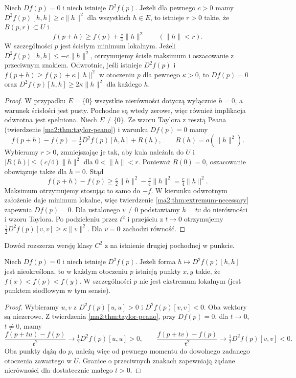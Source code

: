 \begin{twierdzenie}
\label{ma2:thm:extremum-sufficient}
Niech $Df(p)=0$ i niech istnieje $D^2f(p)$.
Jeżeli dla pewnego $c>0$ mamy
$D^2f(p)[h,h]\ge c\|h\|^2$ dla wszystkich $h\in E$,
to istnieje $r>0$ takie, że $B(p,r)\subset U$ i
\[
 f(p+h)\ge f(p)+\tfrac c4\|h\|^2
 \qquad(\|h\|<r).
\]
W szczególności $p$ jest ścisłym minimum lokalnym.
Jeżeli $D^2f(p)[h,h]\le -c\|h\|^2$, otrzymujemy
ścisłe maksimum i oszacowanie z przeciwnym znakiem.
Odwrotnie, jeśli istnieje $D^2f(p)$ i
$f(p+h)\ge f(p)+\kappa\|h\|^2$ w otoczeniu $p$
dla pewnego $\kappa>0$, to $Df(p)=0$ oraz
$D^2f(p)[h,h]\ge2\kappa\|h\|^2$ dla każdego $h$.
\end{twierdzenie}
\begin{proof}
W przypadku $E=\{0\}$ wszystkie nierówności dotyczą
wyłącznie $h=0$, a warunek ścisłości jest pusty.
Pochodne są wtedy zerowe, więc również implikacja
odwrotna jest spełniona. Niech $E\ne\{0\}$.
Ze wzoru Taylora z resztą Peana
(twierdzenie \ref{ma2:thm:taylor-peano}) i warunku $Df(p)=0$
mamy
\[
 f(p+h)-f(p)=\tfrac12 D^2f(p)[h,h]+R(h),
 \qquad R(h)=o(\|h\|^2).
\]
Wybieramy $r>0$, zmniejszając je tak, aby kula należała
do $U$ i $|R(h)|\le(c/4)\|h\|^2$ dla $0<\|h\|<r$.
Ponieważ $R(0)=0$, oszacowanie obowiązuje także dla $h=0$.
Stąd
\[
 f(p+h)-f(p)\ge \tfrac c2\|h\|^2-\tfrac c4\|h\|^2
 =\tfrac c4\|h\|^2.
\]
Maksimum otrzymujemy stosując to samo do $-f$.
W kierunku odwrotnym założenie daje minimum lokalne,
więc twierdzenie \ref{ma2:thm:extremum-necessary}
zapewnia $Df(p)=0$. Dla ustalonego $v\ne0$
podstawiamy $h=tv$ do nierówności i wzoru Taylora.
Po podzieleniu przez $t^2$ i przejściu z $t\to0$
otrzymujemy $\tfrac12 D^2f(p)[v,v]\ge\kappa\|v\|^2$.
Dla $v=0$ zachodzi równość.
\end{proof}
Dowód rozszerza wersję klasy $C^2$ z
na istnienie drugiej pochodnej w punkcie.

\begin{stwierdzenie}
\label{ma2:prop:saddle-hessian}
Niech $Df(p)=0$ i niech istnieje $D^2f(p)$.
Jeżeli forma $h\mapsto D^2f(p)[h,h]$ jest nieokreślona,
to w każdym otoczeniu $p$ istnieją punkty $x,y$ takie,
że $f(x)<f(p)<f(y)$. W szczególności $p$ nie jest
ekstremum lokalnym (jest punktem siodłowym w tym sensie).
\end{stwierdzenie}
\begin{proof}
Wybieramy $u,v$ z $D^2f(p)[u,u]>0$ i
$D^2f(p)[v,v]<0$. Oba wektory są niezerowe.
Z twierdzenia \ref{ma2:thm:taylor-peano},
przy $Df(p)=0$, dla $t\to0$, $t\ne0$, mamy
\[
 \frac{f(p+tu)-f(p)}{t^2}\longrightarrow
 \tfrac12D^2f(p)[u,u]>0,\qquad
 \frac{f(p+tv)-f(p)}{t^2}\longrightarrow
 \tfrac12D^2f(p)[v,v]<0.
\]
Oba punkty dążą do $p$, należą więc od pewnego momentu
do dowolnego zadanego otoczenia zawartego w $U$.
Granice o przeciwnych znakach zapewniają żądane
nierówności dla dostatecznie małego $t>0$.
\end{proof}

